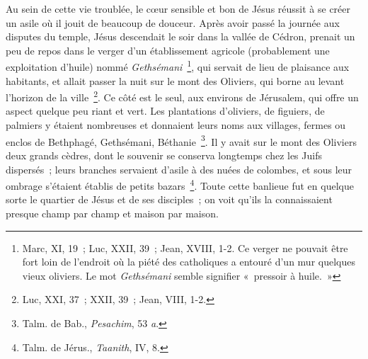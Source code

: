 \documentclass[french,twoside]{book} %
\begin{document}
Au sein de cette vie troublée, le cœur sensible et bon de Jésus réussit à se créer un asile où il jouit de beaucoup de douceur. Après avoir passé la journée aux disputes du temple, Jésus descendait le soir dans la vallée de Cédron, prenait un peu de repos dans le verger d’un établissement agricole (probablement une exploitation d’huile) nommé {\itshape Gethsémani} \footnote{ Marc, XI, 19 ; Luc, XXII, 39 ; Jean, XVIII, 1-2. Ce verger ne pouvait être fort loin de l’endroit où la piété des catholiques a entouré d’un mur quelques vieux oliviers. Le mot {\itshape Gethsémani} semble signifier « pressoir à huile. »}, qui servait de lieu de plaisance aux habitants, et allait passer la nuit sur le mont des Oliviers, qui borne au levant l’horizon de la ville \footnote{Luc, XXI, 37 ; XXII, 39 ; Jean, VIII, 1-2.}. Ce côté est le seul, aux environs de Jérusalem, qui offre un aspect quelque peu riant et vert. Les plantations d’oliviers, de figuiers, de palmiers y étaient nombreuses et donnaient leurs noms aux villages, fermes ou enclos de Bethphagé, Gethsémani, Béthanie \footnote{ Talm. de Bab., {\itshape Pesachim}, 53 {\itshape a}.}. Il y avait sur le mont des Oliviers deux grands cèdres, dont le souvenir se conserva longtemps chez les Juifs dispersés ; leurs branches servaient d’asile à des nuées de colombes, et sous leur ombrage s’étaient établis de petits bazars \footnote{ Talm. de Jérus., {\itshape Taanith}, IV, 8.}. Toute cette banlieue fut en quelque sorte le quartier de Jésus et de ses disciples ; on voit qu’ils la connaissaient presque champ par champ et maison par maison.\par
\end{document}
